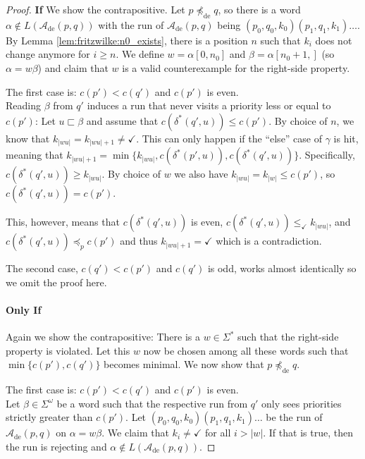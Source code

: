 \begin{proof}
	\textbf{If} We show the contrapositive. Let $p \not\preceq_\text{de} q$, so there is a word $\alpha \notin L(\mathcal{A}_\text{de}(p, q))$ with the run of $\mathcal{A}_\text{de}(p, q)$ being $(p_0, q_0, k_0) (p_1, q_1, k_1) \dots$. By Lemma \ref{lem:fritzwilke:n0_exists}, there is a position $n$ such that $k_i$ does not change anymore for $i \geq n$. We define $w = \alpha[0, n_0]$ and $\beta = \alpha[n_0+1, ]$ (so $\alpha = w\beta$) and claim that $w$ is a valid counterexample for the right-side property.
	
	The first case is: $c(p') < c(q')$ and $c(p')$ is even. \\
	Reading $\beta$ from $q'$ induces a run that never visits a priority less or equal to $c(p')$: Let $u \sqsubset \beta$ and assume that $c(\delta^*(q', u)) \leq c(p')$. By choice of $n$, we know that $k_{|wu|} = k_{|wu|+1} \neq \checkmark$. This can only happen if the \enquote{else} case of $\gamma$ is hit, meaning that $k_{|wu|+1} = \min \{ k_{|wu|}, c(\delta^*(p', u)), c(\delta^*(q', u)) \}$. Specifically, $c(\delta^*(q', u)) \geq k_{|wu|}$. By choice of $w$ we also have $k_{|wu|} = k_{|w|} \leq c(p')$, so $c(\delta^*(q', u)) = c(p')$.
	
	This, however, means that $c(\delta^*(q', u))$ is even, $c(\delta^*(q', u)) \leq_\checkmark k_{|wu|}$, and $c(\delta^*(q', u)) \preceq_p c(p')$ and thus $k_{|wu|+1} = \checkmark$ which is a contradiction.
	
	The second case, $c(q') < c(p')$ and $c(q')$ is odd, works almost identically so we omit the proof here.
	
	\paragraph{Only If} Again we show the contrapositive: There is a $w \in \Sigma^*$ such that the right-side property is violated. Let this $w$ now be chosen among all these words such that $\min \{ c(p'), c(q') \}$ becomes minimal. We now show that $p \not\preceq_\text{de} q$. 
	
	The first case is: $c(p') < c(q')$ and $c(p')$ is even. \\
	Let $\beta \in \Sigma^\omega$ be a word such that the respective run from $q'$ only sees priorities strictly greater than $c(p')$. Let $(p_0, q_0, k_0) (p_1, q_1, k_1) \dots$ be the run of $\mathcal{A}_\text{de}(p, q)$ on $\alpha = w \beta$. We claim that $k_i \neq \checkmark$ for all $i > |w|$. If that is true, then the run is rejecting and $\alpha \notin L(\mathcal{A}_\text{de}(p, q))$.
	

\end{proof}

